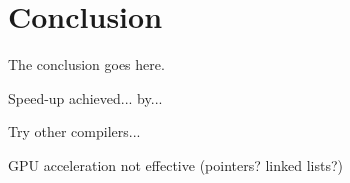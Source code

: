 \documentclass[conference]{IEEEtran}
\begin{document}




\section{Conclusion}
The conclusion goes here.

Speed-up achieved... by...

Try other compilers...

GPU acceleration not effective (pointers? linked lists?)










%






\end{document}

